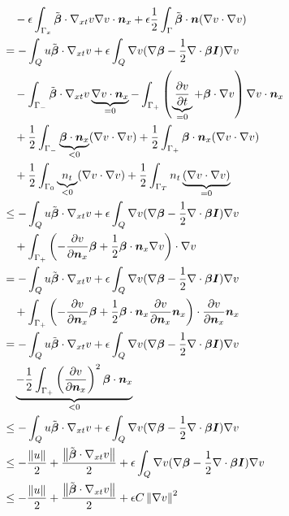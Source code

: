 \documentclass{article}
\begin{document}
\begin{enumerate}
\begin{align*}
&\quad-\epsilon\int_{\Gamma_x}\tilde\bfbeta\cdot\Gradxt v\Grad v\cdot\bfn_x
+\epsilon\frac{1}{2}\int_\Gamma\tilde\bfbeta\cdot\bfn(\Grad v\cdot\Grad v)\\
%
&=-\int_Q u\tilde\bfbeta\cdot\Gradxt v
+\epsilon\int_Q\Grad v(\Grad\bfbeta-\frac{1}{2}\Div\bfbeta\bfI)\Grad v\\
&\quad
-\int_{\Gamma_-}\tilde\bfbeta\cdot\Gradxt v\underbrace{\Grad v\cdot\bfn_x}_{=0}
-\int_{\Gamma_+}\LRp{\underbrace{\pd{v}{t}}_{=0}+\bfbeta\cdot\Grad v}\Grad v\cdot\bfn_x\\
&\quad
+\frac{1}{2}\int_{\Gamma_-}\underbrace{\bfbeta\cdot\bfn_x}_{<0}(\Grad v\cdot\Grad v)
+\frac{1}{2}\int_{\Gamma_+}\bfbeta\cdot\bfn_x(\Grad v\cdot\Grad v)\\
&\quad
+\frac{1}{2}\int_{\Gamma_0}\underbrace{n_t}_{<0}(\Grad v\cdot\Grad v)
+\frac{1}{2}\int_{\Gamma_T}n_t\underbrace{(\Grad v\cdot\Grad v)}_{=0}\\
%
&\leq-\int_Q u\tilde\bfbeta\cdot\Gradxt v
+\epsilon\int_Q\Grad v(\Grad\bfbeta-\frac{1}{2}\Div\bfbeta\bfI)\Grad v\\
&\quad
+\int_{\Gamma_+}\LRp{-\pd{v}{\bfn_x}\bfbeta
+\frac{1}{2}\bfbeta\cdot\bfn_x\Grad v}\cdot\Grad v\\
%
&=-\int_Q u\tilde\bfbeta\cdot\Gradxt v
+\epsilon\int_Q\Grad v(\Grad\bfbeta-\frac{1}{2}\Div\bfbeta\bfI)\Grad v\\
&\quad
+\int_{\Gamma_+}\LRp{-\pd{v}{\bfn_x}\bfbeta
+\frac{1}{2}\bfbeta\cdot\bfn_x\pd{v}{\bfn_x}\bfn_x}\cdot\pd{v}{\bfn_x}\bfn_x\\
%
&=-\int_Q u\tilde\bfbeta\cdot\Gradxt v
+\epsilon\int_Q\Grad v(\Grad\bfbeta-\frac{1}{2}\Div\bfbeta\bfI)\Grad v\\
&\quad
\underbrace{-\frac{1}{2}\int_{\Gamma_+}\LRp{\pd{v}{\bfn_x}}^2\bfbeta\cdot\bfn_x}_{<0}\\
%
&\leq-\int_Q u\tilde\bfbeta\cdot\Gradxt v
+\epsilon\int_Q\Grad v(\Grad\bfbeta-\frac{1}{2}\Div\bfbeta\bfI)\Grad v\\
%
&\leq-\frac{\norm{u}}{2}+\frac{\norm{\tilde\bfbeta\cdot\Gradxt v}}{2}
+\epsilon\int_Q\Grad v(\Grad\bfbeta-\frac{1}{2}\Div\bfbeta\bfI)\Grad v\\
%
&\leq-\frac{\norm{u}}{2}+\frac{\norm{\tilde\bfbeta\cdot\Gradxt v}}{2}
+\epsilon C\norm{\Grad v}^2
\end{align*}


\end{enumerate}
\end{document}
